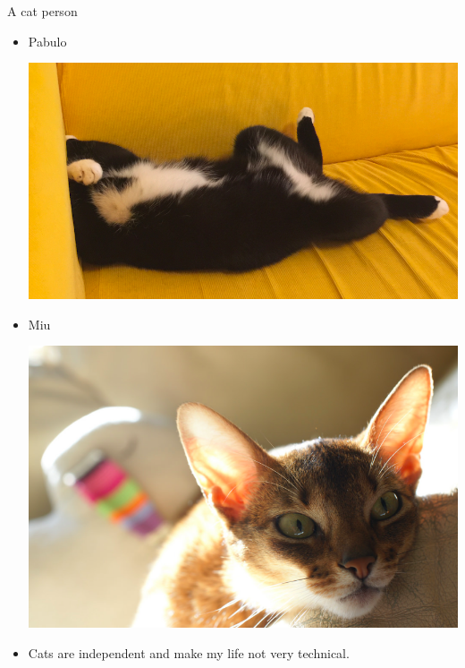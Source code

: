 \documentclass[first=dgreen,second=purple,logo=yellowexc]{aaltoslides}
\begin{document}
\begin{frame}{A cat person}
	\begin{itemize}
		\item Pabulo
		\begin{center}
			\includegraphics[scale=0.15]{./plots/pabulo3.jpg}
		\end{center}
		\item Miu
		\begin{center}
			\includegraphics[scale=0.15,origin=c]{./plots/miu.jpg}
		\end{center}
		\item Cats are independent and make my life not very technical.
	\end{itemize}
\end{frame}
\end{document}
